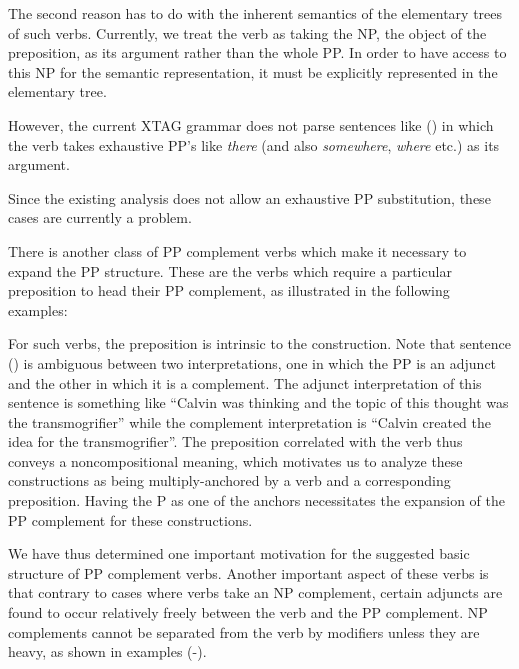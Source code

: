 
The second reason has to do with the inherent semantics of the elementary
trees of such verbs. Currently, we treat the verb as taking the NP, the
object of the preposition, as its argument rather than the whole PP. In
order to have access to this NP for the semantic representation, it must be
explicitly represented in the elementary tree.

However, the current XTAG grammar does not parse sentences like () in
which the verb takes exhaustive PP's like {\it there} (and also {\it
somewhere}, {\it where} etc.) as its argument. 


Since the existing analysis does not allow an exhaustive PP substitution,
these cases are currently a problem.

There is another class of PP complement verbs which make it necessary to
expand the PP structure. These are the verbs which require a particular
preposition to head their PP complement, as illustrated in the following
examples:


For such verbs, the preposition is intrinsic to the construction.  Note
that sentence () is ambiguous between two interpretations, one in
which the PP is an adjunct and the other in which it is a complement.  The
adjunct interpretation of this sentence is something like ``Calvin was
thinking and the topic of this thought was the transmogrifier'' while the
complement interpretation is ``Calvin created the idea for the
transmogrifier''.  The preposition correlated with the verb thus conveys a
noncompositional meaning, which motivates us to analyze these constructions
as being multiply-anchored by a verb and a corresponding preposition.
Having the P as one of the anchors necessitates the expansion of the PP
complement for these constructions.

We have thus determined one important motivation for the suggested basic
structure of PP complement verbs.  Another important aspect of these verbs
is that contrary to cases where verbs take an NP complement, certain
adjuncts are found to occur relatively freely between the verb and the PP
complement. NP complements cannot be separated from the verb by modifiers
unless they are heavy, as shown in examples (-).

